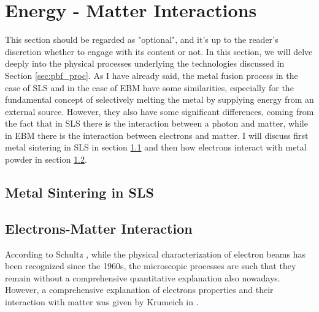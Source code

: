 \section{Energy - Matter Interactions}
\label{sec:matterint}
This section should be regarded as "optional", and it's up to the reader's discretion whether to engage with its content or not. In this section, we will delve deeply into the physical processes underlying the technologies discussed in Section \ref{sec:pbf_proc}. As I have already said, the metal fusion process in the case of SLS and in the case of EBM have some similarities, especially for the fundamental concept of selectively melting the metal by supplying energy from an external source. However, they also have some significant differences, coming from the fact that in SLS there is the interaction between a photon  and matter, while in EBM there is the interaction between electrons and matter. I will discuss first metal sintering in SLS in section \ref{subsec:sintering} and then how electrons interact with metal powder in section \ref{subsec:ebminter}.

\subsection{Metal Sintering in SLS}
\label{subsec:sintering}


\subsection{Electrons-Matter Interaction}
\label{subsec:ebminter}
According to Schultz \cite{schultz_h_electron_1994}, while the physical characterization of electron beams has been recognized since the 1960s, the microscopic processes are such that they remain without a comprehensive quantitative explanation also nowadays. However, a comprehensive explanation of electrons properties and their interaction with matter was given by Krumeich in \cite{krumeich_properties_nodate}.

